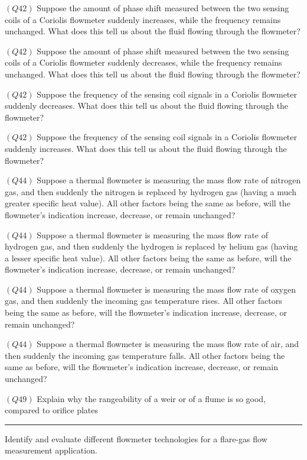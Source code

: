 \medskip
\item{$(Q42)$} Suppose the amount of phase shift measured between the two sensing coils of a Coriolis flowmeter suddenly increases, while the frequency remains unchanged.  What does this tell us about the fluid flowing through the flowmeter?
\item{$(Q42)$} Suppose the amount of phase shift measured between the two sensing coils of a Coriolis flowmeter suddenly decreases, while the frequency remains unchanged.  What does this tell us about the fluid flowing through the flowmeter?
\item{$(Q42)$} Suppose the frequency of the sensing coil signals in a Coriolis flowmeter suddenly decreases.  What does this tell us about the fluid flowing through the flowmeter?
\item{$(Q42)$} Suppose the frequency of the sensing coil signals in a Coriolis flowmeter suddenly increases.  What does this tell us about the fluid flowing through the flowmeter?
\item{$(Q44)$} Suppose a thermal flowmeter is measuring the mass flow rate of nitrogen gas, and then suddenly the nitrogen is replaced by hydrogen gas (having a much greater specific heat value).  All other factors being the same as before, will the flowmeter's indication increase, decrease, or remain unchanged?
\item{$(Q44)$} Suppose a thermal flowmeter is measuring the mass flow rate of hydrogen gas, and then suddenly the hydrogen is replaced by helium gas (having a lesser specific heat value).  All other factors being the same as before, will the flowmeter's indication increase, decrease, or remain unchanged?
\item{$(Q44)$} Suppose a thermal flowmeter is measuring the mass flow rate of oxygen gas, and then suddenly the incoming gas temperature rises.  All other factors being the same as before, will the flowmeter's indication increase, decrease, or remain unchanged?
\item{$(Q44)$} Suppose a thermal flowmeter is measuring the mass flow rate of air, and then suddenly the incoming gas temperature falls.  All other factors being the same as before, will the flowmeter's indication increase, decrease, or remain unchanged?
\item{$(Q49)$} Explain why the rangeability of a weir or of a flume is so good, compared to orifice plates
\medskip


\filbreak \vskip 5pt \hrule \vskip 5pt  \vskip 10pt

Identify and evaluate different flowmeter technologies for a flare-gas flow measurement application.


\bye




